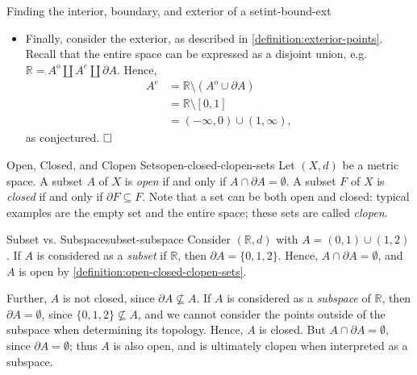 \documentclass{article}
\renewcommand*\qedsymbol{\hfill\ensuremath{\Box}}
\numberwithin{equation}{section}
\begin{document}
\begin{example}{Finding the interior, boundary, and exterior of a
        set}{int-bound-ext}
\begin{itemize}
            Now, we show that there are no other boundary points of $ A $ in $
            \mathbb{R} $. We know that $ \mathbb{R} = A^o \coprod \partial A
            \coprod A^e $, hence $ A^o \cup \partial A = \emptyset $, thus $ (0,
            1) \not\subset \partial A $. Without loss of generality for $ x < 0
            $, consider points $ x > 1 $. Therefore, there exists an $ \epsilon
            > 0 $ such that $ x = 1 + \epsilon $. Considering $ B(x, \epsilon/2)
            $, we can see that $ B(x, \epsilon/2) \subset A^c $, which implies
            that $ B(x, \epsilon/2) \cap A = \emptyset $. Thus, $ \{ 0, 1 \} =
            \partial A $.
        \item Finally, consider the exterior, as described in
            \cref{definition:exterior-points}. Recall that the entire space can
            be expressed as a disjoint union, e.g. $ \mathbb{R} = A^o \coprod
            A^e \coprod \partial A $. Hence,
            \begin{align}
                A^e &= \mathbb{R} \setminus \left( A^o \cup \partial A
                    \right) \\
                &= \mathbb{R} \setminus [0, 1] \\
                &= (-\infty, 0) \cup (1, \infty),
            \end{align}
            as conjectured. $ \qedsymbol $
    \end{itemize}
\end{example}
\begin{definition}{Open, Closed, and Clopen Sets}{open-closed-clopen-sets}
    Let $ (X, d) $ be a metric space. A subset $ A $ of $ X $ is \emph{open} if
    and only if $ A \cap \partial A = \emptyset $. A subset $ F $ of $ X $ is
    \emph{closed} if and only if $ \partial F \subseteq F $. Note that a set can
    be both open and closed: typical examples are the empty set and the entire
    space; these sets are called \emph{clopen}.
\end{definition}
\begin{example}{Subset vs. Subspace}{subset-subspace}
    Consider $ (\mathbb{R}, d) $ with $ A = (0, 1) \cup (1, 2) $. If $ A $ is
    considered as a \emph{subset} if $ \mathbb{R} $, then $ \partial A = \{0, 1,
    2 \} $. Hence, $ A \cap \partial A = \emptyset $, and $ A $ is open by
    \cref{definition:open-closed-clopen-sets}.

    Further, $ A $ is not closed, since $ \partial A \not\subseteq A $. If $ A $
    is considered as a \emph{subspace} of $ \mathbb{R} $, then $ \partial A =
    \emptyset $, since $ \{ 0, 1, 2 \} \not\subseteq A $, and we cannot consider
    the points outside of the subspace when determining its topology. Hence, $ A
    $ is closed. But $ A \cap \partial A = \emptyset $, since $ \partial A =
    \emptyset $; thus $ A $ is also open, and is ultimately clopen when
    interpreted as a subspace.
\end{example}
\end{document}
